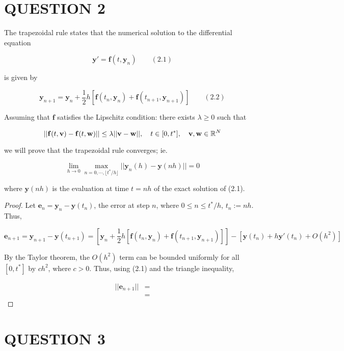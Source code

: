 \documentclass[a4paper]{article}
\begin{document}
\section{QUESTION 2}

The trapezoidal rule states that the numerical solution to the differential equation

\[ \mathbf{y}' = \mathbf{f}(t,\mathbf{y}_{n}) \qquad (2.1) \]

is given by

\[ \mathbf{y}_{n+1} = \mathbf{y}_{n} + \frac{1}{2} h [ \mathbf{f}(t_{n},\mathbf{y}_{n}) + \mathbf{f}(t_{n+1},\mathbf{y}_{n+1})  ] \qquad (2.2) \]

Assuming that $ \mathbf{f} $ satisfies the Lipschitz condition: there exists $ \lambda  \geq 0 $ such that

\[ | | \mathbf{f}(t,\mathbf{v}) - \mathbf{f}(t,\mathbf{w}) | | \leq \lambda | |  \mathbf{v} - \mathbf{w} | |, \quad t \in [0,t^{*}], \quad \mathbf{v},\mathbf{w} \in \mathbb{R}^{N} \]

we will prove that the trapezoidal rule converges; ie. 

\[ \lim\limits_{h \to 0} \max_{n = 0,\cdots,\lfloor t^{*} / h \rfloor } | |  \mathbf{y}_{n}(h) - \mathbf{y}(nh)  | | = 0 \]

where $ \mathbf{y}(nh) $ is the evaluation at time $ t = nh $ of the exact solution of (2.1).




\begin{proof}
	Let $ \mathbf{e}_{n} = \mathbf{y}_{n} - \mathbf{y}(t_{n}) $, the error at step $ n $, where $ 0 \leq n \leq t^{*} / h $, $ t_{n} := n h $. Thus,
	
	\[ \mathbf{e}_{n+1} = \mathbf{y}_{n+1} - \mathbf{y}(t_{n+1}) = [  \mathbf{y}_{n} + \frac{1}{2} h [ \mathbf{f}(t_{n},\mathbf{y}_{n}) + \mathbf{f}(t_{n+1},\mathbf{y}_{n+1})  ] ] - [  \mathbf{y}(t_{n}) + h \mathbf{y}'(t_{n}) + O(h^{2}) ] \]
	
	By the Taylor theorem, the $ O(h^{2}) $ term can be bounded uniformly for all $ [0,t^{*}] $ by $ ch^{2} $, where $ c > 0 $. Thus, using (2.1) and the triangle inequality, 
	
	\begin{align*}
	| | \mathbf{e}_{n+1} | |  & = \\
	& = 
	\end{align*}
\end{proof}

\section{QUESTION 3}
\end{document}
